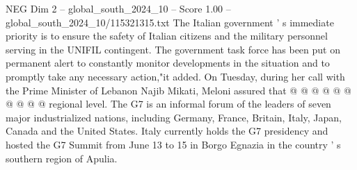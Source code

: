 \begin{textsample}{NEG Dim 2 – global\_south\_2024\_10 – Score 1.00 – global\_south\_2024\_10/115321315.txt}
The Italian government ' s immediate priority is to ensure the safety of Italian citizens and the military personnel serving in the UNIFIL contingent.
The government task force has been put on permanent alert to constantly monitor developments in the situation and to promptly take any necessary action,"it added.
On Tuesday, during her call with the Prime Minister of Lebanon Najib Mikati, Meloni assured that @ @ @ @ @ @ @ @ @ @ regional level.
The G7 is an informal forum of the leaders of seven major industrialized nations, including Germany, France, Britain, Italy, Japan, Canada and the United States.
Italy currently holds the G7 presidency and hosted the G7 Summit from June 13 to 15 in Borgo Egnazia in the country ' s southern region of Apulia.

\end{textsample}
